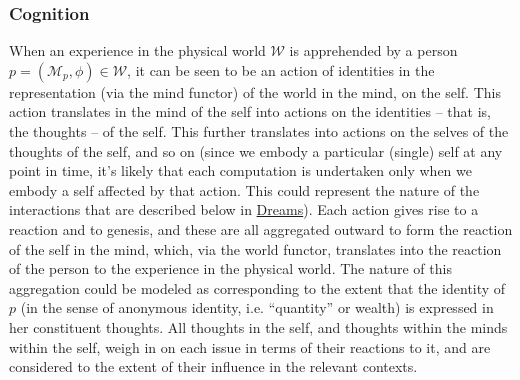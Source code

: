 \documentclass[pra,twocolumn,groupedaddress,10pt]{revtex4}
\theoremstyle{definition}
\begin{document}
\subsubsection{Cognition} \label{sec:cognition}

When an experience in the physical world $\mathcal{W}$ is apprehended by a person $p = (\mathcal{M}_{p}, \phi) \in \mathcal{W}$, it can be seen to be an action of identities in the representation (via the mind functor) of the world in the mind, on the self. This action translates in the mind of the self into actions on the identities -- that is, the thoughts -- of the self. This further translates into actions on the selves of the thoughts of the self, and so on (since we embody a particular (single) self at any point in time, it's likely that each computation is undertaken only when we embody a self affected by that action. This could represent the nature of the interactions that are described below in \hyperref[sec:dreams]{Dreams}). Each action gives rise to a reaction and to genesis, and these are all aggregated outward to form the reaction of the self in the mind, which, via the world functor, translates into the reaction of the person to the experience in the physical world. The nature of this aggregation could be modeled as corresponding to the extent that the identity of $p$ (in the sense of anonymous identity, i.e. ``quantity'' or wealth) is expressed in her constituent thoughts. All thoughts in the self, and thoughts within the minds within the self, weigh in on each issue in terms of their reactions to it, and are considered to the extent of their influence in the relevant contexts.
\end{document}
